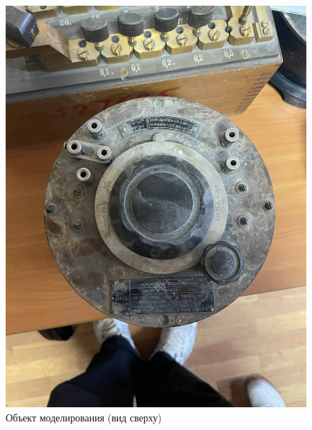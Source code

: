 \documentclass[a4paper,12pt]{article}
\begin{document}
    \begin{figure}[H]
        \centering
        \includegraphics[width=\linewidth]{ph_orig_1}
        \caption{Объект моделирования (вид сверху)}
    \end{figure}
\end{document}
